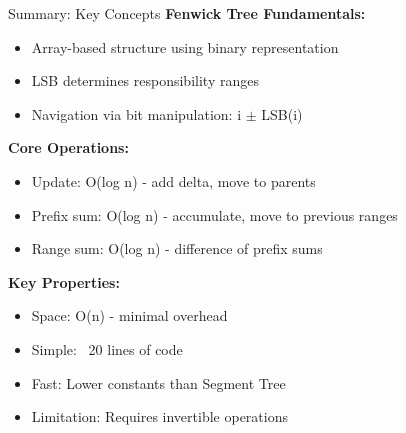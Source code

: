 \documentclass[aspectratio=169]{beamer}
\begin{document}
\begin{frame}{Summary: Key Concepts}
  \textbf{Fenwick Tree Fundamentals:}
  \begin{itemize}
    \item Array-based structure using binary representation
    \item LSB determines responsibility ranges
    \item Navigation via bit manipulation: i $\pm$ LSB(i)
  \end{itemize}

  \vspace{0.5cm}
  \textbf{Core Operations:}
  \begin{itemize}
    \item Update: O(log n) - add delta, move to parents
    \item Prefix sum: O(log n) - accumulate, move to previous ranges
    \item Range sum: O(log n) - difference of prefix sums
  \end{itemize}

  \vspace{0.5cm}
  \textbf{Key Properties:}
  \begin{itemize}
    \item Space: O(n) - minimal overhead
    \item Simple: ~20 lines of code
    \item Fast: Lower constants than Segment Tree
    \item Limitation: Requires invertible operations
  \end{itemize}
\end{frame}
\end{document}
